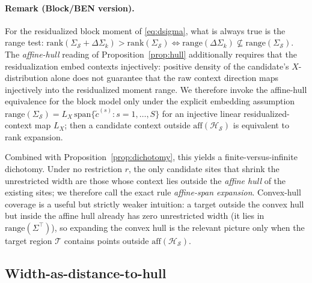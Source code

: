 \paragraph{Remark (Block/BEN version).}
For the residualized block moment of \eqref{eq:dsigma}, what is always true is
the range test:
$\mathrm{rank}(\Sigma_\mathcal{S}+\Delta\Sigma_k)>\mathrm{rank}(\Sigma_\mathcal{S})
 \iff \mathrm{range}(\Delta\Sigma_k)\not\subseteq\mathrm{range}(\Sigma_\mathcal{S})$.
The \emph{affine-hull} reading of Proposition~\ref{prop:hull} additionally
requires that the residualization embed contexts injectively: positive density
of the candidate's $X$-distribution alone does not guarantee that the raw
context direction maps injectively into the residualized moment range. We
therefore invoke the affine-hull equivalence for the block model only under the
explicit embedding assumption
$\mathrm{range}(\Sigma_\mathcal{S})=L_X\,\mathrm{span}\{\tilde c^{(s)}:s=1,\dots,S\}$
for an injective linear residualized-context map $L_X$; then a candidate context
outside $\mathrm{aff}(\mathcal{H}_\mathcal{S})$ is equivalent to rank expansion.

Combined with Proposition~\ref{prop:dichotomy}, this yields a
finite-versus-infinite dichotomy. Under no restriction $r$, the only candidate
sites that shrink the unrestricted width are those whose context lies outside
the \emph{affine hull} of the existing sites; we therefore call the exact rule
\emph{affine-span expansion}. Convex-hull coverage is a useful but strictly
weaker intuition: a target outside the convex hull but inside the affine hull
already has zero unrestricted width (it lies in $\mathrm{range}(\Sigma^\top)$),
so expanding the convex hull is the relevant picture only when the target region
$\mathcal{T}$ contains points outside $\mathrm{aff}(\mathcal{H}_\mathcal{S})$.

\subsection{Width-as-distance-to-hull}
\label{sec:hull-distance}

